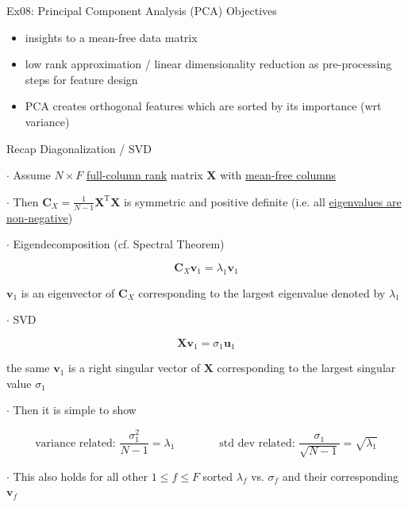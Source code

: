 \documentclass[mathserif, aspectratio=1610]{intbeamer}
\begin{document}
\begin{frame}{Ex08: Principal Component Analysis (PCA)}
Objectives
\begin{itemize}
\item insights to a mean-free data matrix
\item low rank approximation / linear dimensionality reduction as pre-processing steps for feature design
\item PCA creates orthogonal features which are sorted by its importance (wrt variance)
\end{itemize}
\end{frame}


\begin{frame}[t]{Recap Diagonalization / SVD}

$\cdot$ Assume $N \times F$ \underline{full-column rank} matrix $\bm{X}$ with \underline{mean-free columns}

$\cdot$ Then $\bm{C}_X = \frac{1}{N-1}\bm{X}^\mathrm{T}\bm{X}$ is symmetric and positive definite (i.e. all \underline{eigenvalues are non-negative})

$\cdot$ Eigendecomposition (cf. Spectral Theorem)

$$\bm{C}_X \bm{v}_1 = \lambda_1 \bm{v}_1$$

$\bm{v}_1$ is an eigenvector of $\bm{C}_X$ corresponding to the largest eigenvalue denoted by $\lambda_1$

$\cdot$ SVD

$$\bm{X} \bm{v}_1 = \sigma_1 \bm{u}_1$$

the same $\bm{v}_1$ is a right singular vector of $\bm{X}$ corresponding to the largest singular value $\sigma_1$

$\cdot$ Then it is simple to show

$$\text{variance related:}\,\,\frac{\sigma_1^2}{N-1} = \lambda_1 \qquad\qquad \text{std dev related:}\,\,\frac{\sigma_1}{\sqrt{N-1}} = \sqrt{\lambda_1}$$

$\cdot$ This also holds for all other $1\leq f \leq F$ sorted $\lambda_f$ vs. $\sigma_f$ and their corresponding $\bm{v}_f$


\end{frame}
\end{document}
